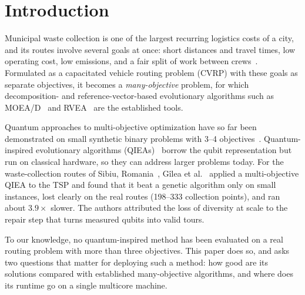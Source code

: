 \section{Introduction}
\label{sec:introduction}

Municipal waste collection is one of the largest recurring logistics costs of a
city, and its routes involve several goals at once: short distances and travel
times, low operating cost, low emissions, and a fair split of work between
crews~\cite{belien2014waste,chen2025smartcities}. Formulated as a capacitated
vehicle routing problem (CVRP) with these goals as separate objectives, it becomes
a \emph{many-objective} problem, for which decomposition- and
reference-vector-based evolutionary algorithms such as MOEA/D~\cite{zhang2007moead}
and RVEA~\cite{cheng2016rvea} are the established tools.

Quantum approaches to multi-objective optimization have so far been
demonstrated on small synthetic binary problems with 3--4
objectives~\cite{kotil2025qamoo,king2025moqa}. Quantum-inspired evolutionary
algorithms (QIEAs)~\cite{han2002qea} borrow the qubit representation but run on
classical hardware, so they can address larger problems today. For the waste-collection routes of Sibiu, Romania~\cite{banciu2025iot}, Gîlea et
al.~\cite{gilea2026scalable} applied a multi-objective QIEA to the TSP and found
that it beat a genetic algorithm only on small instances, lost clearly on the
real routes (198--333 collection points), and ran about $3.9\times$ slower. The
authors attributed the loss of diversity at scale to the repair step that
turns measured qubits into valid tours.

To our knowledge, no quantum-inspired method has been evaluated on a real
routing problem with more than three objectives. This paper does so, and asks two
questions that matter for deploying such a method: how good are its solutions
compared with established many-objective algorithms, and where does its runtime
go on a single multicore machine.

